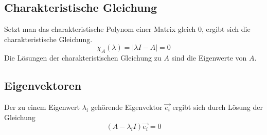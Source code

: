 \subsection{Charakteristische Gleichung}
\label{sub:charakteristische_gleichung}

Setzt man das charakteristische Polynom einer Matrix gleich 0, ergibt sich die charakteristische Gleichung.
\begin{equation}
	\chi_A(\lambda) = |\lambda I-A| = 0
\end{equation}
Die Lösungen der charakteristischen Gleichung zu $A$ sind die Eigenwerte von $A$.

\subsection{Eigenvektoren}
\label{sub:eigenvektoren}

Der zu einem Eigenwert $\lambda_i$ gehörende Eigenvektor $\overrightarrow{e_i}$ ergibt sich durch Lösung der Gleichung
\begin{equation}
	(A - \lambda_i I)\overrightarrow{e_i} = 0
\end{equation}